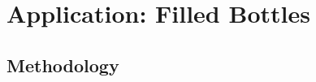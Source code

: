 \documentclass[a4paper,12pt]{article}
\begin{document}
\newpage

\section{Application: Filled Bottles}




\subsection{Methodology}

\end{document}
